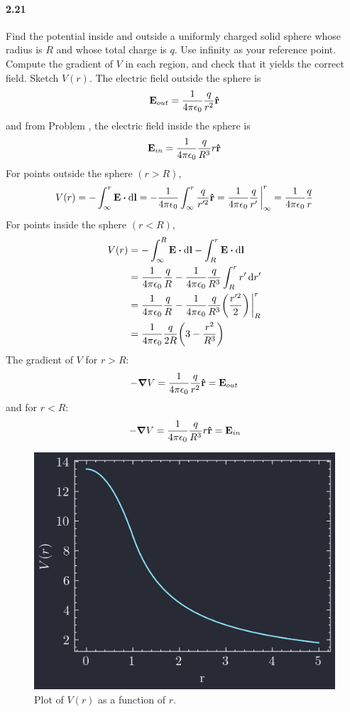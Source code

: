 \documentclass[../main.tex]{subfiles}
\begin{document}
\paragraph{2.21}
Find the potential inside and outside a uniformly charged solid sphere whose radius is $R$ and whose
total charge is $q$. Use infinity as your reference point. Compute the gradient of $V$ in each
region, and check that it yields the correct field. Sketch $V(r)$.
\barh
The electric field outside the sphere is
\[ \vb{E}_{out} = \frac{1}{4\pi\epsilon_0} \frac{q}{r^2} \vu{r} \]
and from Problem , the electric field inside the sphere is
\[ \vb{E}_{in} = \frac{1}{4\pi\epsilon_0} \frac{q}{R^3} r \vu{r} \]
For points outside the sphere $(r > R)$,
\[
    V(r) = - \int_\infty^r \vb{E} \vdot \dd{\vb{l}} = - \ke \int_\infty^r \frac{q}{r'^2} \vu{r}
    = \ke \frac{q}{r'} \eval_\infty^r = \ke \frac{q}{r}
\]
For points inside the sphere $(r < R)$,
\begin{align*}
    V(r) &= - \int_\infty^R \vb{E} \vdot \dd{\vb{l}} - \int_R^r \vb{E} \vdot \dd{\vb{l}} \\
    &= \ke \frac{q}{R} - \ke \frac{q}{R^3} \int_R^r r' \dd{r'} \\
    &= \ke \frac{q}{R} - \ke \frac{q}{R^3} \qt(\frac{r'^2}{2}) \eval_R^r \\
    &= \ke \frac{q}{2R} \qt(3 - \frac{r^2}{R^3}) 
\end{align*}
The gradient of $V$ for $r > R$:
\[ -\grad V = \frac{1}{4\pi\epsilon_0} \frac{q}{r^2} \vu{r} = \vb{E}_{out} \]
and for $r < R$:
\[ -\grad V = \frac{1}{4\pi\epsilon_0} \frac{q}{R^3} r \vu{r} = \vb{E}_{in} \]
\begin{figure}[ht]
    \centering
    \includegraphics[width=0.5\linewidth]{images/fig2_21.png}
    \captionsetup{width=0.8\linewidth}
    \caption{Plot of $V(r)$ as a function of $r$.}
    \label{fig:2_21}
\end{figure}
\end{document}
